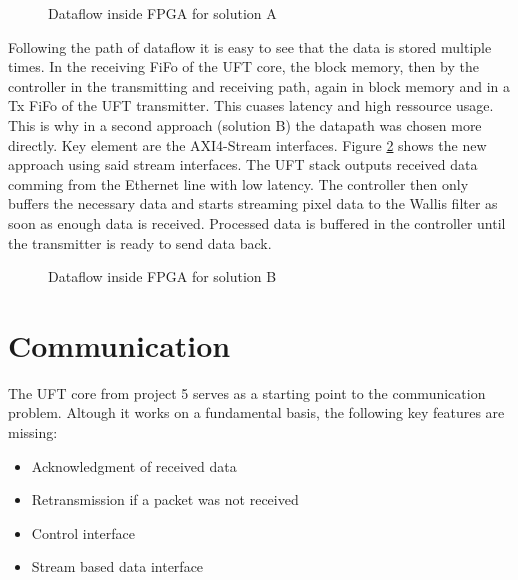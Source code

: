 \begin{figure}[t!]
    \centering
    \begin{adjustbox}{max width=\textwidth}
        
    \end{adjustbox}
    \caption{Dataflow inside FPGA for solution A}
    \label{fig:dataflowa}
\end{figure}

Following the path of dataflow it is easy to see that the data is stored
multiple
times. In the receiving FiFo of the UFT core, the block memory, then by the
controller in the transmitting and receiving path, again in block memory and in
a Tx FiFo of the UFT transmitter. This cuases latency and high ressource usage.
This is why in a second approach (solution B) the datapath was chosen more
directly. Key element are the AXI4-Stream interfaces. Figure \ref{fig:dataflowb}
shows the new approach using said stream interfaces. The UFT stack outputs
received data comming from the Ethernet line with low latency. The controller
then only buffers the necessary data and starts streaming pixel data to the
Wallis filter as soon as enough data is received. Processed data is buffered in
the controller until the transmitter is ready to send data back.

\begin{figure}[b!]
    \centering
    \begin{adjustbox}{max width=\textwidth}
        
    \end{adjustbox}
    \caption{Dataflow inside FPGA for solution B}
    \label{fig:dataflowb}
\end{figure}

\section{Communication}
The UFT core from project 5 serves as a starting point to the communication
problem. Altough it works on a fundamental basis, the following key features are
missing:

\begin{itemize}
	\item Acknowledgment of received data
	\item Retransmission if a packet was not received
	\item Control interface
	\item Stream based data interface
\end{itemize}

